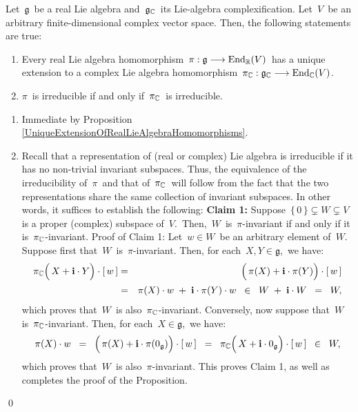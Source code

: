 
\begin{proposition}
\label{propnIrreducibleComplexRepresentationsOfRealLieAlgebras}
\mbox{}
\vskip 0.05cm
\noindent
Let \,$\mathfrak{g}$\, be a real Lie algebra and
\,$\mathfrak{g}_{\mathbb{C}}$\, its Lie-algebra complexification.
Let \,$V$\, be an arbitrary finite-dimensional complex vector space.
Then, the following statements are true:
\begin{enumerate}
\item
	Every real Lie algebra homomorphism
	\,$\pi : \mathfrak{g} \longrightarrow \textnormal{End}_{\mathbb{R}}(V)$\,
	has a unique extension to a complex Lie algebra homomorphism
	\,$\pi_{\mathbb{C}} : \mathfrak{g}_{\mathbb{C}} \longrightarrow \textnormal{End}_{\mathbb{C}}(V)$.\,
\item
	$\pi$\, is irreducible if and only if \,$\pi_{\mathbb{C}}$\, is irreducible.
\end{enumerate}
\end{proposition}
\proof
\begin{enumerate}
\item
	Immediate by Proposition \ref{UniqueExtensionOfRealLieAlgebraHomomorphisms}.
\item
	Recall that a representation of (real or complex) Lie algebra is irreducible if it has
	no non-trivial invariant subspaces.
	Thus, the equivalence of the irreducibility of \,$\pi$\, and that of \,$\pi_{\mathbb{C}}$\,
	will follow from the fact that the two representations share the same collection
	of invariant subspaces. In other words, it suffices to establish the following:
	\vskip 0.2cm
	\noindent
	\textbf{Claim 1:}\quad
	Suppose \,$\{\,0\,\} \subsetneq W \subsetneq V$\, is a proper (complex) subspace of \,$V$.\,
	Then, \,$W$\, is \,$\pi$-invariant if and only if it is \,$\pi_{\mathbb{C}}$-invariant. 
	\vskip 0.1cm
	\noindent
	Proof of Claim 1:\quad
	Let \,$w \in W$\, be an arbitrary element of \,$W$.\,
	Suppose first that \,$W$\, is \,$\pi$-invariant.
	Then, for each \,$X, Y \in \mathfrak{g}$,\, we have:
	\begin{eqnarray*}
	\pi_{\C}\!\left(\,X \overset{{\color{white}.}}{+} \i\cdot Y \right) \cdot [\,w\,]
	& = &
		\left(\,\pi(X) \overset{{\color{white}.}}{+} \i\cdot \pi(Y) \right) \cdot [\,w\,]
	\\
	& = &
		\pi(X) \cdot w \;\overset{{\color{white}.}}{+}\; \i\cdot \pi(Y) \cdot w
	\;\; \in \;\;
		W \; + \; \i \cdot W
	\;\; = \;\;
		W,
	\end{eqnarray*}
	which proves that \,$W$\, is also \,$\pi_{\mathbb{C}}$-invariant.
	Conversely, now suppose that \,$W$\, is \,$\pi_{\mathbb{C}}$-invariant.
	Then, for each \,$X \in \mathfrak{g}$,\, we have:
	\begin{equation*}
	\pi(X)\cdot w
	\;\; = \;\;
		\left(\,\pi(X) \overset{{\color{white}.}}{+} \i\cdot \pi(0_{\mathfrak{g}}) \right) \cdot [\,w\,]
	\;\; = \;\;
		\pi_{\C}\!\left(\,X \overset{{\color{white}.}}{+} \i\cdot 0_{\mathfrak{g}} \right) \cdot [\,w\,]
	\;\; \in \;\;
		W,
	\end{equation*}
	which proves that \,$W$\, is also \,$\pi$-invariant.
	This proves Claim 1, as well as completes the proof of the Proposition.
\end{enumerate}
\qed

